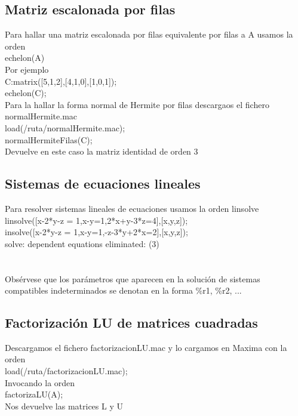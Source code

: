 \documentclass[a4paper, 12pt] {article}
\begin{document}
\subsection{Matriz escalonada por filas}

Para hallar una matriz escalonada por filas equivalente por filas a A usamos la orden\\
echelon(A)\\
Por ejemplo\\
C:matrix([5,1,2],[4,1,0],[1,0,1]);\\
echelon(C);\\

Para la hallar la forma normal de Hermite por filas descargaos el fichero normalHermite.mac\\
load(/ruta/normalHermite.mac);\\
normalHermiteFilas(C);\\
Devuelve en este caso la matriz identidad de orden 3\\

\subsection{Sistemas de ecuaciones lineales}
Para resolver sistemas lineales de ecuaciones usamos la orden linsolve\\
linsolve([x-2*y-z = 1,x-y=1,2*x+y-3*z=4],[x,y,z]);\\
insolve([x-2*y-z = 1,x-y=1,-z-3*y+2*x=2],[x,y,z]);\\
solve: dependent equations eliminated: (3)\\
[x = 1 − \%r1, y = − \%r1, z = \%r1]\\\\
Obsérvese que los parámetros que aparecen en la solución de sistemas compatibles indeterminados se
denotan en la forma \%r1, \%r2, ...

\subsection{Factorización LU de matrices cuadradas}
Descargamos el fichero factorizacionLU.mac y lo cargamos en Maxima con la orden\\
load(/ruta/factorizacionLU.mac);\\
Invocando la orden\\
factorizaLU(A);\\
Nos devuelve las matrices L y U\\
\end{document}
